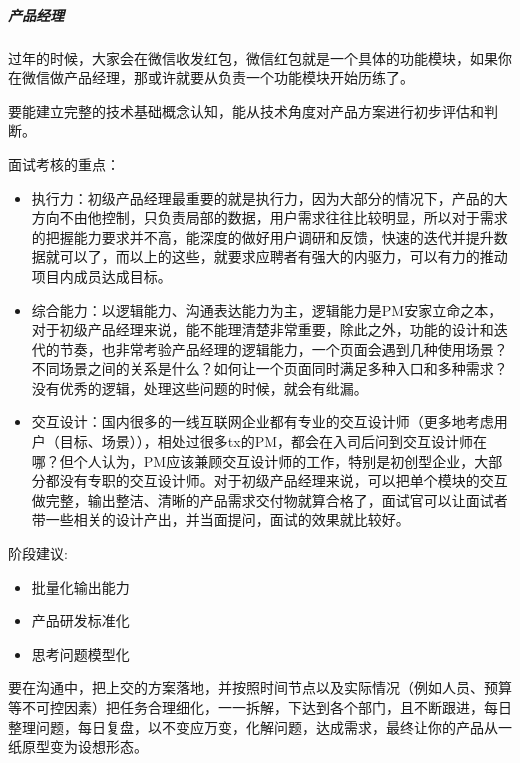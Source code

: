 \documentclass[letterpaper,10pt,english]{sphinxmanual}
\begin{document}


\subparagraph{产品经理}
\label{\detokenize{chapter_introduction/career_path:id11}}
过年的时候，大家会在微信收发红包，微信红包就是一个具体的功能模块，如果你在微信做产品经理，那或许就要从负责一个功能模块开始历练了。

要能建立完整的技术基础概念认知，能从技术角度对产品方案进行初步评估和判断。

面试考核的重点：
\begin{itemize}
\item {} 
执行力：初级产品经理最重要的就是执行力，因为大部分的情况下，产品的大方向不由他控制，只负责局部的数据，用户需求往往比较明显，所以对于需求的把握能力要求并不高，能深度的做好用户调研和反馈，快速的迭代并提升数据就可以了，而以上的这些，就要求应聘者有强大的内驱力，可以有力的推动项目内成员达成目标。

\item {} 
综合能力：以逻辑能力、沟通表达能力为主，逻辑能力是PM安家立命之本，对于初级产品经理来说，能不能理清楚非常重要，除此之外，功能的设计和迭代的节奏，也非常考验产品经理的逻辑能力，一个页面会遇到几种使用场景？不同场景之间的关系是什么？如何让一个页面同时满足多种入口和多种需求？没有优秀的逻辑，处理这些问题的时候，就会有纰漏。

\item {} 
交互设计：国内很多的一线互联网企业都有专业的交互设计师（更多地考虑用户（目标、场景）），相处过很多tx的PM，都会在入司后问到交互设计师在哪？但个人认为，PM应该兼顾交互设计师的工作，特别是初创型企业，大部分都没有专职的交互设计师。对于初级产品经理来说，可以把单个模块的交互做完整，输出整洁、清晰的产品需求交付物就算合格了，面试官可以让面试者带一些相关的设计产出，并当面提问，面试的效果就比较好。

\end{itemize}

阶段建议:
\begin{itemize}
\item {} 
批量化输出能力

\item {} 
产品研发标准化

\item {} 
思考问题模型化

\end{itemize}

要在沟通中，把上交的方案落地，并按照时间节点以及实际情况（例如人员、预算等不可控因素）把任务合理细化，一一拆解，下达到各个部门，且不断跟进，每日整理问题，每日复盘，以不变应万变，化解问题，达成需求，最终让你的产品从一纸原型变为设想形态。%
\begin{footnote}[356]\sphinxAtStartFootnote
{}
%
\end{footnote}
\end{document}
